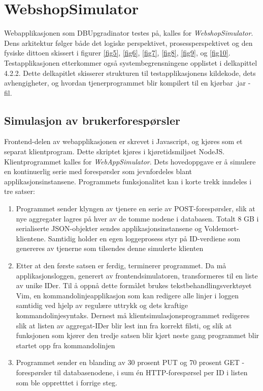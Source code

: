 \section{WebshopSimulator} \label{prog}

Webapplikasjonen som DBUpgradinator testes på, kalles for \emph{WebshopSimulator}. Dens arkitektur følger både det logiske perspektivet, prosess\-perspektivet og den fysiske dittoen skissert i figurer \ref{fig5}, \ref{fig6}, \ref{fig7}, \ref{fig8}, \ref{fig9}, og \ref{fig10}. Testapplikasjonen etterkommer også systembegrensningene opplistet i delkapittel 4.2.2. Dette delkapitlet skisserer strukturen til testapplikasjonens kildekode, dets avhengigheter, og hvordan tjenerprogrammet blir kompilert til en kjørbar .jar - fil.

\subsection{Simulasjon av brukerforespørsler}

Frontend-delen av webapplikasjonen er skrevet i Javascript, og kjøres som et separat klientprogram. Dette skriptet kjøres i kjøretidsmiljøet NodeJS. Klientprogrammet kalles for \emph{WebAppSimulator}. Dets hovedoppgave er å simulere en kontinuerlig serie med forespørsler som jevnfordeles blant applikasjonsinstansene. Programmets funksjonalitet kan i korte trekk inndeles i tre satser:

\begin{enumerate}
  \item Programmet sender klyngen av tjenere en serie av POST-forespørsler, slik at nye aggregater lagres på hver av de tomme nodene i databasen. Totalt 8 GB i serialiserte JSON-objekter sendes applikasjonsinstansene og Voldemort-klientene. Samtidig holder en egen loggeprosess styr på ID-verdiene som genereres av tjenerne som tilsendes denne simulerte klienten
  \item Etter at den første satsen er ferdig, terminerer programmet. Da må applikasjonsloggen, generert av frontendsimulatoren, transformeres til en liste av unike IDer. Til å oppnå dette formålet brukes tekstbehandlingsverktøyet Vim, en kommandolinjeapplikasjon som kan redigere alle linjer i loggen samtidig ved hjelp av regulære uttrykk og dets kraftige kommandolinjesyntaks. Dernest må klientsimulasjonsprogrammet redigeres slik at listen av aggregat-IDer blir lest inn fra korrekt filsti, og slik at funksjonen som kjører den tredje satsen blir kjørt neste gang programmet blir startet opp fra kommandolinjen
  \item Programmet sender en blanding av 30 prosent PUT og 70 prosent GET - forespørsler til databasenodene, i sum én HTTP-forespørsel per ID i listen som ble oppretttet i forrige steg.
\end{enumerate}

